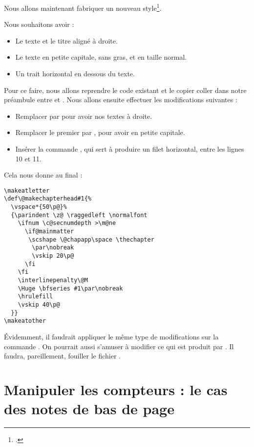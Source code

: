 Nous allons maintenant fabriquer un nouveau style\footcite[Nous nous inspirons ici du style de la classe ][]{bredele}.

Nous souhaitons avoir :
\begin{itemize}
\item Le texte  et le titre aligné à droite.
\item Le texte  en  petite capitale, sans gras, et en taille normal.
\item Un trait horizontal en dessous du texte.
\end{itemize}

Pour ce faire, nous allons reprendre le code existant et le copier coller dans notre préambule entre  et . Nous allons ensuite effectuer les modifications suivantes :

\begin{itemize}
\item Remplacer  par  pour avoir nos textes à droite.
\item Remplacer le premier  par , pour avoir  en petite capitale.
\item Insérer la commande , qui sert à produire un filet horizontal, entre les lignes 10 et 11.
\end{itemize}

Cela nous donne au final :

\begin{verbatim}
\makeatletter
\def\@makechapterhead#1{%
  \vspace*{50\p@}%
  {\parindent \z@ \raggedleft \normalfont
    \ifnum \c@secnumdepth >\m@ne
      \if@mainmatter
       \scshape \@chapapp\space \thechapter
        \par\nobreak
        \vskip 20\p@
      \fi
    \fi
    \interlinepenalty\@M
    \Huge \bfseries #1\par\nobreak
    \hrulefill
    \vskip 40\p@
  }}
\makeatother
\end{verbatim}

Évidemment, il faudrait appliquer le même type de modifications sur la commande . On pourrait aussi s'amuser à modifier ce qui est produit par . Il faudra, pareillement, fouiller le fichier .

\section[Manipuler les compteurs]{Manipuler les compteurs : le cas des notes de bas de page}

